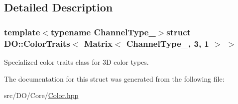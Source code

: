 \subsection{Detailed Description}
\subsubsection*{template$<$typename Channel\-Type\-\_\-$>$struct D\-O\-::\-Color\-Traits$<$ Matrix$<$ Channel\-Type\-\_\-, 3, 1 $>$ $>$}

Specialized color traits class for 3\-D color types. 

The documentation for this struct was generated from the following file\-:\begin{DoxyCompactItemize}
\item 
src/\-D\-O/\-Core/\hyperlink{_color_8hpp}{Color.\-hpp}\end{DoxyCompactItemize}

